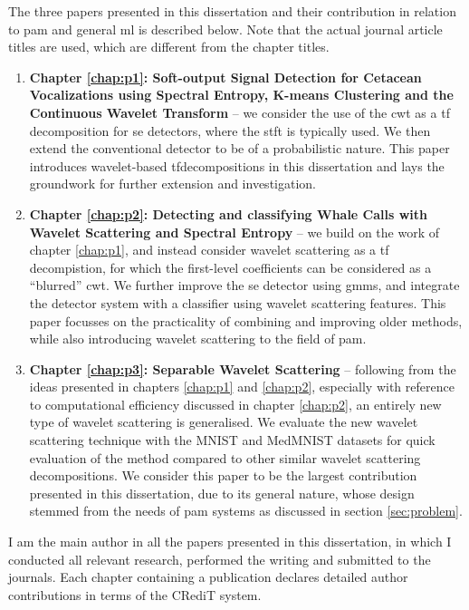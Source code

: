 The three papers presented in this dissertation and their contribution in relation to \ac{pam} and general \ac{ml} is described below. Note that the actual journal article titles are used, which are different from the chapter titles.

\begin{enumerate}
    \item \textbf{Chapter \ref*{chap:p1}: Soft-output Signal Detection for Cetacean Vocalizations using Spectral Entropy, K-means Clustering and the Continuous Wavelet Transform} -- we consider the use of the \ac{cwt} as a \ac{tf} decomposition for \ac{se} detectors, where the \ac{stft} is typically used. We then extend the conventional detector to be of a probabilistic nature. This paper introduces wavelet-based \ac{tf}decompositions in this dissertation and lays the groundwork for further extension and investigation.
    \item \textbf{Chapter \ref*{chap:p2}: Detecting and classifying Whale Calls with Wavelet Scattering and Spectral Entropy} -- we build on the work of chapter \ref*{chap:p1}, and instead consider wavelet scattering as a \ac{tf} decompistion, for which the first-level coefficients can be considered as a ``blurred'' \ac{cwt}. We further improve the \ac{se} detector using \acp{gmm}, and integrate the detector system with a classifier using wavelet scattering features. This paper focusses on the practicality of combining and improving older methods, while also introducing wavelet scattering to the field of \ac{pam}.
    \item \textbf{Chapter \ref*{chap:p3}: Separable Wavelet Scattering} -- following from the ideas presented in chapters \ref*{chap:p1} and \ref*{chap:p2}, especially with reference to computational efficiency discussed in chapter \ref*{chap:p2}, an entirely new type of wavelet scattering is generalised. We evaluate the new wavelet scattering technique with the MNIST and MedMNIST datasets for quick evaluation of the method compared to other similar wavelet scattering decompositions. We consider this paper to be the largest contribution presented in this dissertation, due to its general nature, whose design stemmed from the needs of \ac{pam} systems as discussed in section \ref*{sec:problem}.
\end{enumerate}

I am the main author in all the papers presented in this dissertation, in which I conducted all relevant research, performed the writing and submitted to the journals. Each chapter containing a publication declares detailed author contributions in terms of the CRediT system.